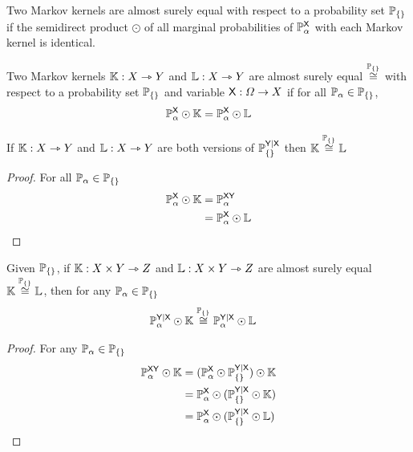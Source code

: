Two Markov kernels are almost surely equal with respect to a probability set $\mathbb{P}_{\{\}}$ if the semidirect product $\odot$ of all marginal probabilities of $\mathbb{P}_\alpha^{\mathsf{X}}$ with each Markov kernel is identical.

\begin{definition}\label{def:asequal}
Two Markov kernels $\mathbb{K}:X\rightarrowtriangle Y$ and $\mathbb{L}:X\rightarrowtriangle Y$ are almost surely equal $\overset{\mathbb{P}_{\{\}}}{\cong}$ with respect to a probability set $\mathbb{P}_{\{\}}$ and variable $\mathsf{X}:\Omega\to X$ if for all $\mathbb{P}_\alpha \in \mathbb{P}_{\{\}}$,
\begin{align}
	\mathbb{P}^{\mathsf{X}}_\alpha\odot \mathbb{K}=\mathbb{P}^{\mathsf{X}}_\alpha\odot \mathbb{L}
\end{align}
\end{definition}

\begin{lemma}
If $\mathbb{K}:X\rightarrowtriangle Y$ and $\mathbb{L}:X\rightarrowtriangle Y$ are both versions of $\mathbb{P}_{\{\}}^{\mathsf{Y}|\mathsf{X}}$ then $\mathbb{K}\overset{\mathbb{P}_{\{\}}}{\cong}\mathbb{L}$
\end{lemma}

\begin{proof}
For all $\mathbb{P}_\alpha \in \mathbb{P}_{\{\}}$
\begin{align}
	\mathbb{P}^{\mathsf{X}}_\alpha\odot \mathbb{K} &= \mathbb{P}^{\mathsf{XY}}_\alpha\\
	&= \mathbb{P}^{\mathsf{X}}_\alpha\odot \mathbb{L}
\end{align}
\end{proof}

\begin{lemma}
Given $\mathbb{P}_{\{\}}$, if $\mathbb{K}:X\times Y \rightarrowtriangle Z$ and $\mathbb{L}:X\times Y \rightarrowtriangle Z$ are almost surely equal $\mathbb{K}\overset{\mathbb{P}_{\{\}}}{\cong}\mathbb{L}$, then for any $\mathbb{P}_\alpha\in \mathbb{P}_{\{\}}$
\begin{align}
	\mathbb{P}_\alpha^{\mathsf{Y}|\mathsf{X}}\odot \mathbb{K} &\overset{\mathbb{P}_{\{\}}}{\cong} \mathbb{P}_\alpha^{\mathsf{Y}|\mathsf{X}}\odot \mathbb{L}
\end{align}
\end{lemma}

\begin{proof}
For any $\mathbb{P}_\alpha\in\mathbb{P}_{\{\}}$
\begin{align}
	\mathbb{P}_\alpha^{\mathsf{XY}}\odot \mathbb{K} &= (\mathbb{P}_\alpha^{\mathsf{X}}\odot \mathbb{P}_{\{\}}^{\mathsf{Y}|\mathsf{X}})\odot \mathbb{K}\\
											  &= \mathbb{P}_\alpha^{\mathsf{X}}\odot (\mathbb{P}_{\{\}}^{\mathsf{Y}|\mathsf{X}}\odot \mathbb{K})\\
											  &= \mathbb{P}_\alpha^{\mathsf{X}}\odot (\mathbb{P}_{\{\}}^{\mathsf{Y}|\mathsf{X}}\odot \mathbb{L})
\end{align}
\end{proof}

